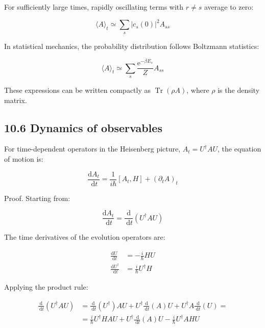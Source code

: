 \documentclass[italian]{HKNdocument}
\begin{document}
For sufficiently large times, rapidly oscillating terms with $r \neq s$ average to zero:

\begin{equation*}
\langle A\rangle_{t} \simeq \sum_{s}\left|c_{s}(0)\right|^{2} A_{s s} \tag{10.36}
\end{equation*}

In statistical mechanics, the probability distribution follows Boltzmann statistics:

\begin{equation*}
\langle A\rangle_{t} \simeq \sum_{s} \frac{\mathrm{e}^{-\beta E_{s}}}{Z} A_{s s} \tag{10.37}
\end{equation*}

These expressions can be written compactly as $\operatorname{Tr}(\rho A)$, where $\rho$ is the density matrix.

\subsection*{10.6 Dynamics of observables}
For time-dependent operators in the Heisenberg picture, $A_t = U^\dagger A U$, the equation of motion is:

\begin{equation*}
\frac{\mathrm{d} A_{t}}{\mathrm{~d} t}=\frac{1}{i \hbar}\left[A_{t}, H\right]+\left(\partial_{t} A\right)_{t} \tag{10.38}
\end{equation*}


Proof. Starting from:

\begin{equation*}
\frac{\mathrm{d} A_{t}}{\mathrm{~d} t}=\frac{\mathrm{d}}{\mathrm{~d} t}\left(U^{\dagger} A U\right) \tag{10.39}
\end{equation*}

The time derivatives of the evolution operators are:

\begin{align*}
\frac{\mathrm{d} U}{\mathrm{~d} t} & =-\frac{i}{\hbar} H U \\
\frac{\mathrm{d} U^{\dagger}}{\mathrm{~d} t} & =\frac{i}{\hbar} U^{\dagger} H \tag{10.40}
\end{align*}

Applying the product rule:

\begin{align*}
\frac{\mathrm{d}}{\mathrm{~d} t}\left(U^{\dagger} A U\right) & =\frac{\mathrm{d}}{\mathrm{~d} t}\left(U^{\dagger}\right) A U+U^{\dagger} \frac{\mathrm{d}}{\mathrm{~d} t}(A) U+U^{\dagger} A \frac{\mathrm{~d}}{\mathrm{~d} t}(U)=  \tag{10.41}\\
& =\frac{i}{\hbar} U^{\dagger} H A U+U^{\dagger} \frac{\mathrm{~d}}{\mathrm{~d} t}(A) U-\frac{i}{\hbar} U^{\dagger} A H U
\end{align*}
\end{document}
